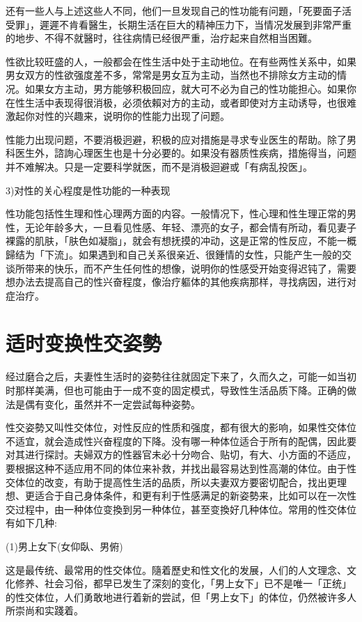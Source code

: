\documentclass[12pt,UTF8]{ctexbook}
\begin{document}
还有一些人与上述这些人不同，他们一旦发现自己的性功能有问題，「死要面子活受罪」，遲遲不肯看醫生，长期生活在巨大的精神压力下，当情况发展到非常严重的地步、不得不就醫时，往往病情已经很严重，治疗起来自然相当困難。

性欲比较旺盛的人，一般都会在性生活中处于主动地位。在有些两性关系中，如果男女双方的性欲强度差不多，常常是男女互为主动，当然也不排除女方主动的情况。如果女方主动，男方能够积极回应，就大可不必为自己的性功能担心。如果你在性生活中表现得很消极，必须依賴对方的主动，或者即使对方主动诱导，也很难激起你对性的兴趣来，说明你的性能力出现了问题。

性能力出现问题，不要消极迥避，积极的应对措施是寻求专业医生的帮助。除了男科医生外，諮詢心理医生也是十分必要的。如果没有器质性疾病，措施得当，问题并不难解决。只是一定要科学就医，而不是消极迴避或「有病乱投医」。

3)对性的关心程度是性功能的一种表现

性功能包括性生理和性心理两方面的内容。一般情况下，性心理和性生理正常的男性，无论年龄多大，一旦看见性感、年轻、漂亮的女子，都会情有所动，看见妻子裸露的肌肤，「肤色如凝脂」，就会有想抚摸的冲动，这是正常的性反应，不能一概歸结为「下流」。如果遇到和自己关系很亲近、很鍾情的女性，只能产生一般的交谈所带来的快乐，而不产生任何性的想像，说明你的性感受开始变得迟钝了，需要想办法去提高自己的性兴奋程度，像治疗軀体的其他疾病那样，寻找病因，进行对症治疗。

\section{适时变换性交姿勢}

经过磨合之后，夫妻性生活时的姿勢往往就固定下来了，久而久之，可能一如当初时那样美满，但也可能由于一成不变的固定模式，导致性生活品质下降。正确的做法是偶有变化，虽然并不一定尝試每种姿勢。

性交姿勢又叫性交体位，对性反应的性质和强度，都有很大的影响，如果性交体位不适宜，就会造成性兴奋程度的下降。没有哪一种体位适合于所有的配偶，因此要对其进行探討。夫婦双方的性器官未必十分吻合、贴切，有大、小方面的不适应，要根据这种不适应用不同的体位来补救，并找出最容易达到性高潮的体位。由于性交体位的改变，有助于提高性生活的品质，所以夫妻双方要密切配合，找出更理想、更适合于自己身体条件，和更有利于性感满足的新姿勢来，比如可以在一次性交过程中，由一种体位变換到另一种体位，甚至变換好几种体位。常用的性交体位有如下几种:

(1)男上女下(女仰臥、男俯)

这是最传统、最常用的性交体位。隨着歷史和性文化的发展，人们的人文理念、文化修养、社会习俗，都早已发生了深刻的变化，「男上女下」已不是唯一「正统」的性交体位，人们勇敢地进行着新的尝試，但「男上女下」的体位，仍然被许多人所崇尚和实踐着。
\end{document}
